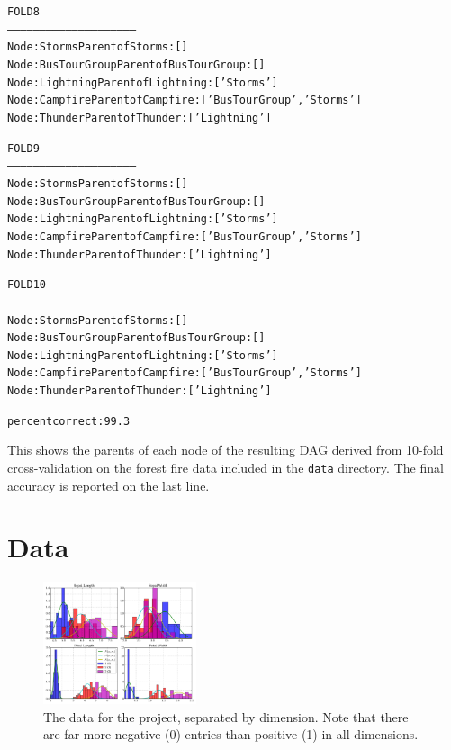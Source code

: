 \begin{shaded}
\begin{alltt}
FOLD 8
-----------------------------------------------------------
Node : Storms   Parent of Storms : []
Node : BusTourGroup   Parent of BusTourGroup : []
Node : Lightning  Parent of Lightning : ['Storms']
Node : Campfire   Parent of Campfire : ['BusTourGroup', 'Storms']
Node : Thunder  Parent of Thunder : ['Lightning']

FOLD 9
-----------------------------------------------------------
Node : Storms   Parent of Storms : []
Node : BusTourGroup   Parent of BusTourGroup : []
Node : Lightning  Parent of Lightning : ['Storms']
Node : Campfire   Parent of Campfire : ['BusTourGroup', 'Storms']
Node : Thunder  Parent of Thunder : ['Lightning']

FOLD 10
-----------------------------------------------------------
Node : Storms   Parent of Storms : []
Node : BusTourGroup   Parent of BusTourGroup : []
Node : Lightning  Parent of Lightning : ['Storms']
Node : Campfire   Parent of Campfire : ['BusTourGroup', 'Storms']
Node : Thunder  Parent of Thunder : ['Lightning']

percent correct: 99.3%
\end{alltt}
\small
\end{shaded}

This shows the parents of each node of the resulting DAG derived from 10-fold cross-validation on the forest fire data included in the \texttt{data} directory.  The final accuracy is reported on the last line.

\section{Data}

\begin{figure}[H]
  \centering
		\includegraphics[width=0.4\textwidth]{images/data.png}
  \caption{\scriptsize The data for the project, separated by dimension.  Note that there are far more negative (0) entries than positive (1) in all dimensions.}
\end{figure}
 






